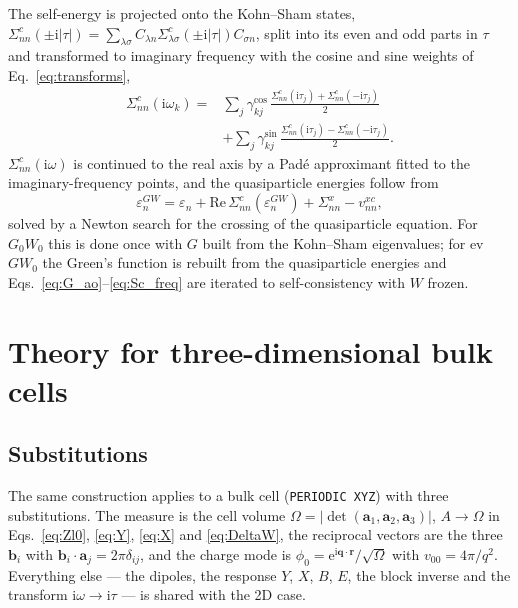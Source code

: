 \documentclass[%
 reprint,
superscriptaddress,
 amsmath,amssymb,
 aps,
prb,
]{revtex4-2}
\newcommand{\br}{\mathbf{r}}
\newcommand{\bq}{\mathbf{q}}
\newcommand{\ii}{\mathrm{i}}
\newcommand{\ee}{\mathrm{e}}
\begin{document}
The self-energy is projected onto the Kohn--Sham states,
$\Sigma^c_{nn}(\pm\ii|\tau|) = \sum_{\lambda\sigma}C_{\lambda n}\Sigma^c_{\lambda\sigma}(\pm\ii|\tau|)C_{\sigma n}$,
split into its even and odd parts in $\tau$ and transformed to imaginary frequency with the
cosine and sine weights of Eq.~\eqref{eq:transforms},
\begin{equation}
\begin{aligned}
  \Sigma^c_{nn}(\ii\omega_k) ={}& \sum_j\gamma^{\cos}_{kj}\,
  \frac{\Sigma^c_{nn}(\ii\tau_j)+\Sigma^c_{nn}(-\ii\tau_j)}{2}\\
  &+ \sum_j\gamma^{\sin}_{kj}\,
  \frac{\Sigma^c_{nn}(\ii\tau_j)-\Sigma^c_{nn}(-\ii\tau_j)}{2}.
\end{aligned}
  \label{eq:Sc_freq}
\end{equation}
$\Sigma^c_{nn}(\ii\omega)$ is continued to the real axis by a Pad\'e approximant fitted to
the imaginary-frequency points, and the quasiparticle energies follow from
\begin{equation}
  \varepsilon^{GW}_n = \varepsilon_n + \mathrm{Re}\,\Sigma^c_{nn}(\varepsilon^{GW}_n)
  + \Sigma^x_{nn} - v^{xc}_{nn},
  \label{eq:QP}
\end{equation}
solved by a Newton search for the crossing of the quasiparticle equation. For $G_0W_0$ this is
done once with $G$ built from the Kohn--Sham eigenvalues; for ev$GW_0$ the Green's function is
rebuilt from the quasiparticle energies and Eqs.~\eqref{eq:G_ao}--\eqref{eq:Sc_freq} are
iterated to self-consistency with $W$ frozen.

\section{Theory for three-dimensional bulk cells}
\label{sec:theory3d}
\label{sec:bulk}

\subsection{Substitutions}
\label{sec:subst3d}

The same construction applies to a bulk cell (\texttt{PERIODIC XYZ}) with three substitutions.
The measure is the cell volume $\Omega = |\det(\mathbf a_1,\mathbf a_2,\mathbf a_3)|$,
$A\to\Omega$ in Eqs.~\eqref{eq:Zl0}, \eqref{eq:Y}, \eqref{eq:X} and \eqref{eq:DeltaW}, the
reciprocal vectors are the three $\mathbf b_i$ with $\mathbf b_i\cdot\mathbf a_j=2\pi\delta_{ij}$,
and the charge mode is $\phi_0 = \ee^{\ii\bq\cdot\br}/\sqrt\Omega$ with $v_{00} = 4\pi/q^2$.
Everything else --- the dipoles, the response $Y$, $X$, $B$, $E$, the block inverse and the
transform $\ii\omega\to\ii\tau$ --- is shared with the 2D case.
\end{document}
